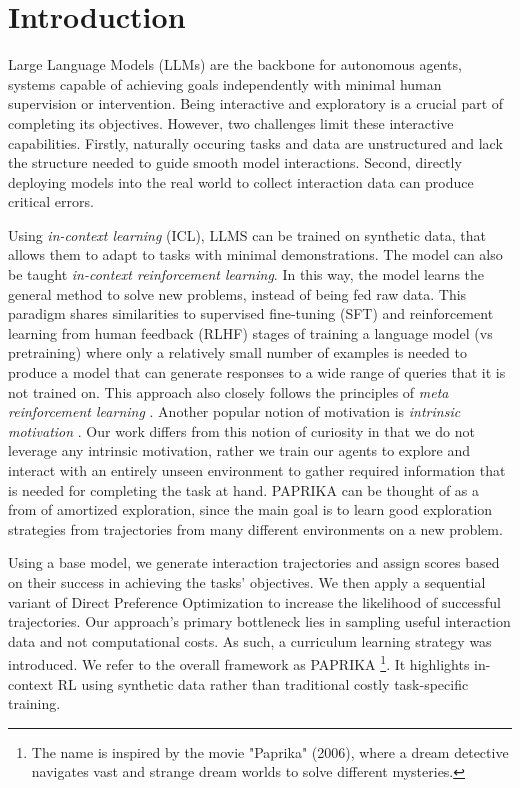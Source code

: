 \documentclass[manuscript,review]{acmart}
\begin{document}
\section{Introduction}
{
Large Language Models (LLMs) are the backbone for autonomous agents, systems capable of
achieving goals independently with minimal human supervision or intervention. Being interactive
and exploratory is a crucial part of completing its objectives. However, two challenges limit these
interactive capabilities. Firstly, naturally occuring tasks and data are unstructured and 
lack the structure needed to guide smooth model interactions. Second, directly deploying models
into the real world to collect interaction data can produce critical errors.

Using \emph{in-context learning} (ICL), LLMS can be trained on synthetic data, that allows
them to adapt to tasks with minimal demonstrations\cite{brown2020language}. The model
can also be taught \emph{in-context reinforcement learning}\cite{laskin2022context}.
In this way, the model learns the general method to solve new problems, instead of being
fed raw data. This paradigm shares similarities to supervised fine-tuning (SFT) and reinforcement
learning from human feedback (RLHF) stages of training a language model (vs pretraining) where
only a relatively small number of examples is needed to produce a model that can generate
responses to a wide range of queries that it is not trained on. 
This approach also closely follows the principles of \emph{meta reinforcement learning}
\cite{beck2023survey}. Another popular notion of motivation is \emph{intrinsic motivation}
\cite{schmidhuber1991curious}. Our work differs from this notion of curiosity 
in that we do not leverage any intrinsic motivation, 
rather we train our agents to explore and interact with an
entirely unseen environment to gather required information that is needed for
completing the task at hand. \textsc{PAPRIKA} can be thought of as a from of
amortized exploration, since the main goal is to learn good exploration strategies from 
trajectories from many different environments on a new problem.

Using a base model, we generate interaction trajectories and assign scores
based on their success in achieving the tasks' objectives. We then apply a sequential 
variant of Direct Preference Optimization\cite{rafailov2024direct} to increase the 
likelihood of successful trajectories. Our approach's primary bottleneck lies in
sampling useful interaction data and not computational costs. As such, a curriculum 
learning strategy was introduced. We refer to the overall framework as \textsc{PAPRIKA 
\footnote{The name is inspired by the movie "Paprika" (2006), where a dream detective navigates vast and strange dream worlds to solve different mysteries.}}.
It highlights in-context RL using synthetic data rather than traditional costly
task-specific training.

}
\end{document}
